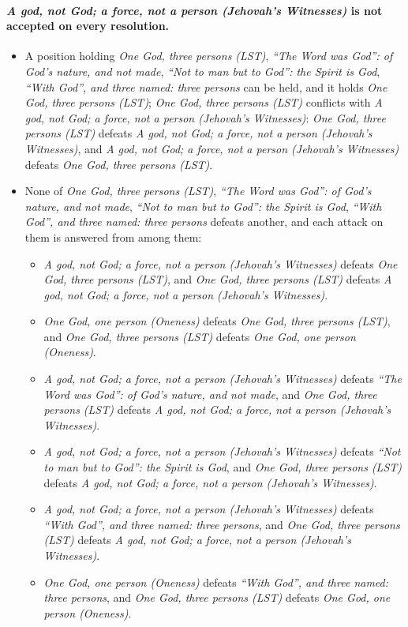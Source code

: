 \documentclass[11pt,paper=\testimonypaper,DIV=13,parskip=false]{scrartcl}
\begin{document}
\paragraph{\emph{A god, not God; a force, not a person (Jehovah’s Witnesses)} is not accepted on every resolution.}
\begin{itemize}
\item A position holding \emph{One God, three persons (LST)}, \emph{“The Word was God”: of God’s nature, and not made}, \emph{“Not to man but to God”: the Spirit is God}, \emph{“With God”, and three named: three persons} can be held, and it holds \emph{One God, three persons (LST)}; \emph{One God, three persons (LST)} conflicts with \emph{A god, not God; a force, not a person (Jehovah’s Witnesses)}: \emph{One God, three persons (LST)} defeats \emph{A god, not God; a force, not a person (Jehovah’s Witnesses)}, and \emph{A god, not God; a force, not a person (Jehovah’s Witnesses)} defeats \emph{One God, three persons (LST)}.
\item None of \emph{One God, three persons (LST)}, \emph{“The Word was God”: of God’s nature, and not made}, \emph{“Not to man but to God”: the Spirit is God}, \emph{“With God”, and three named: three persons} defeats another, and each attack on them is answered from among them:
\begin{itemize}
\item \emph{A god, not God; a force, not a person (Jehovah’s Witnesses)} defeats \emph{One God, three persons (LST)}, and \emph{One God, three persons (LST)} defeats \emph{A god, not God; a force, not a person (Jehovah’s Witnesses)}.
\item \emph{One God, one person (Oneness)} defeats \emph{One God, three persons (LST)}, and \emph{One God, three persons (LST)} defeats \emph{One God, one person (Oneness)}.
\item \emph{A god, not God; a force, not a person (Jehovah’s Witnesses)} defeats \emph{“The Word was God”: of God’s nature, and not made}, and \emph{One God, three persons (LST)} defeats \emph{A god, not God; a force, not a person (Jehovah’s Witnesses)}.
\item \emph{A god, not God; a force, not a person (Jehovah’s Witnesses)} defeats \emph{“Not to man but to God”: the Spirit is God}, and \emph{One God, three persons (LST)} defeats \emph{A god, not God; a force, not a person (Jehovah’s Witnesses)}.
\item \emph{A god, not God; a force, not a person (Jehovah’s Witnesses)} defeats \emph{“With God”, and three named: three persons}, and \emph{One God, three persons (LST)} defeats \emph{A god, not God; a force, not a person (Jehovah’s Witnesses)}.
\item \emph{One God, one person (Oneness)} defeats \emph{“With God”, and three named: three persons}, and \emph{One God, three persons (LST)} defeats \emph{One God, one person (Oneness)}.
\end{itemize}
\end{itemize}
\end{document}
